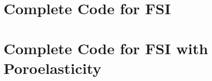 \begin{appendices}
\chapter{Complete Code for FSI}
\chapter{Complete Code for FSI with Poroelasticity}
\end{appendices}
